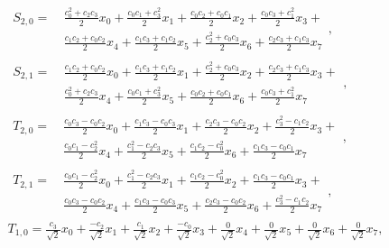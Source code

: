 \begin{gather}
\begin{split}
S_{2,0} = ~
	& \frac{c_{0}^{2} + c_{2} c_{3}}{2} x_{0} + \frac{c_{0} c_{1} + c_{3}^{2}}{2} x_{1} + \frac{c_{0} c_{2} + c_{0} c_{1}}{2} x_{2} + \frac{c_{0} c_{3} + c_{1}^{2}}{2} x_{3} + \\
	& \frac{c_{1} c_{2} + c_{0} c_{2}}{2} x_{4} + \frac{c_{1} c_{3} + c_{1} c_{2}}{2} x_{5} + \frac{c_2^{2} + c_{0} c_{3}}{2} x_{6} + \frac{c_{2} c_{3} + c_{1} c_{3}}{2} x_7
\end{split}
\label{eqn_db2_outvect_s_2_0_full}, \\
\begin{split}
S_{2,1} = ~
	& \frac{c_{1} c_{2} + c_{0} c_{2}}{2} x_{0} + \frac{c_{1} c_{3} + c_{1} c_{2}}{2} x_{1} + \frac{c_2^{2} + c_{0} c_{3}}{2} x_{2} + \frac{c_{2} c_{3} + c_{1} c_{3}}{2} x_{3} + \\
	& \frac{c_0^{2} + c_{2} c_{3}}{2} x_{4} + \frac{c_{0} c_{1} + c_3^{2}}{2} x_{5} + \frac{c_{0} c_{2} + c_{0} c_{1}}{2} x_{6} + \frac{c_{0} c_{3} + c_1^{2}}{2} x_7
\end{split}
\label{eqn_db2_outvect_s_2_1_full}, \\
\begin{split}
T_{2,0} = ~
	& \frac{c_{0} c_{3} - c_{0} c_{2}}{2} x_{0} + \frac{c_{1} c_{3} - c_{0} c_{3}}{2} x_{1} + \frac{c_{2} c_{3} - c_{0} c_{2}}{2} x_{2} + \frac{c_3^{2} - c_{1} c_{2}}{2} x_{3} + \\
	& \frac{c_{0} c_{1} - c_2^{2}}{2} x_{4} + \frac{c_1^{2} - c_{2} c_{3}}{2} x_{5} + \frac{c_{1} c_{2} - c_0^{2}}{2} x_{6} + \frac{c_{1} c_{3} - c_{0} c_{1}}{2} x_7
\end{split}
\label{eqn_db2_outvect_t_2_0_full}, \\
\begin{split}
T_{2,1} = ~
	& \frac{c_{0} c_{1} - c_2^{2}}{2} x_{0} + \frac{c_1^{2} - c_{2} c_{3}}{2} x_{1} + \frac{c_{1} c_{2} - c_0^{2}}{2} x_{2} + \frac{c_{1} c_{3} - c_{0} c_{1}}{2} x_{3} + \\
	& \frac{c_{0} c_{3} - c_{0} c_{2}}{2} x_{4} + \frac{c_{1} c_{3} - c_{0} c_{3}}{2} x_{5} + \frac{c_{2} c_{3} - c_{0} c_{2}}{2} x_{6} + \frac{c_3^{2} - c_{1} c_{2}}{2} x_7
\end{split}
\label{eqn_db2_outvect_t_2_1_full}, \\
T_{1,0} = \frac{c_{3}}{\sqrt{2}} x_{0} + \frac{- c_{2}}{\sqrt{2}} x_{1} + \frac{c_{1}}{\sqrt{2}} x_{2} + \frac{- c_{0}}{\sqrt{2}} x_{3} + \frac{0}{\sqrt{2}} x_{4} + \frac{0}{\sqrt{2}} x_{5} + \frac{0}{\sqrt{2}} x_{6} + \frac{0}{\sqrt{2}} x_{7} \label{eqn_db2_outvect_t_1_0_full}, \\

\end{gather}
